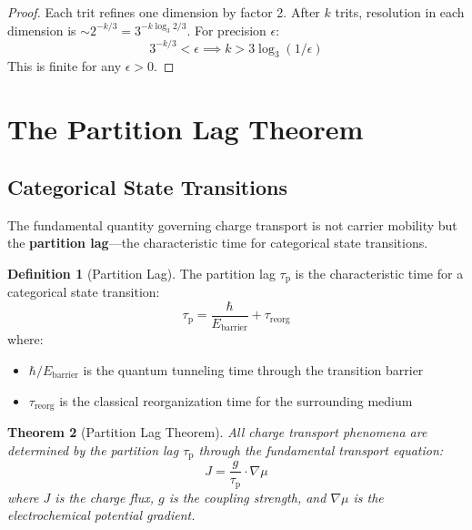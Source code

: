 \documentclass[twocolumn,10pt]{article}
\newtheorem{theorem}{Theorem}[section]
\theoremstyle{definition}
\newtheorem{definition}[theorem]{Definition}
\theoremstyle{remark}
\newcommand{\taup}{\tau_{\mathrm{p}}}
\begin{document}
\begin{proof}
Each trit refines one dimension by factor 2. After $k$ trits, resolution in each dimension is $\sim 2^{-k/3} = 3^{-k\log_3 2/3}$. For precision $\epsilon$:
\begin{equation}
3^{-k/3} < \epsilon \implies k > 3\log_3(1/\epsilon)
\end{equation}
This is finite for any $\epsilon > 0$.
\end{proof}

\section{The Partition Lag Theorem}
\label{sec:partition_lag}

\subsection{Categorical State Transitions}

The fundamental quantity governing charge transport is not carrier mobility but the \textbf{partition lag}---the characteristic time for categorical state transitions.

\begin{definition}[Partition Lag]
\label{def:partition_lag}
The partition lag $\taup$ is the characteristic time for a categorical state transition:
\begin{equation}
\boxed{\taup = \frac{\hbar}{E_{\text{barrier}}} + \tau_{\text{reorg}}}
\end{equation}
where:
\begin{itemize}
    \item $\hbar/E_{\text{barrier}}$ is the quantum tunneling time through the transition barrier
    \item $\tau_{\text{reorg}}$ is the classical reorganization time for the surrounding medium
\end{itemize}
\end{definition}

\begin{theorem}[Partition Lag Theorem]
\label{thm:partition_lag}
All charge transport phenomena are determined by the partition lag $\taup$ through the fundamental transport equation:
\begin{equation}
\boxed{J = \frac{g}{\taup} \cdot \nabla\mu}
\end{equation}
where $J$ is the charge flux, $g$ is the coupling strength, and $\nabla\mu$ is the electrochemical potential gradient.
\end{theorem}
\end{document}
